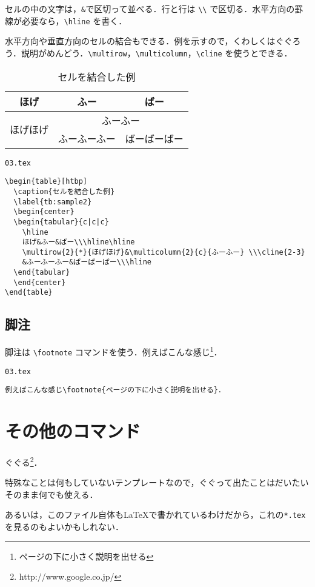 セルの中の文字は，\texttt{\&}で区切って並べる．行と行は \verb|\\| で区切る．水平方向の罫線が必要なら，\verb|\hline| を書く．

水平方向や垂直方向のセルの結合もできる．例を示すので，くわしくはぐぐろう．説明がめんどう．\verb|\multirow|，\verb|\multicolumn|，\verb|\cline| を使うとできる．

\begin{table}[htbp]
  \caption{セルを結合した例}
  \label{tb:sample2}
  \begin{center}
  \begin{tabular}{c|c|c}
    \hline
    ほげ&ふー&ばー\\\hline\hline
    \multirow{2}{*}{ほげほげ}&\multicolumn{2}{c}{ふーふー} \\\cline{2-3}
    &ふーふーふー&ばーばーばー\\\hline
  \end{tabular}
  \end{center}
\end{table}

\begin{itembox}[l]{\texttt{03.tex}}
\begin{verbatim}
\begin{table}[htbp]
  \caption{セルを結合した例}
  \label{tb:sample2}
  \begin{center}
  \begin{tabular}{c|c|c}
    \hline
    ほげ&ふー&ばー\\\hline\hline
    \multirow{2}{*}{ほげほげ}&\multicolumn{2}{c}{ふーふー} \\\cline{2-3}
    &ふーふーふー&ばーばーばー\\\hline
  \end{tabular}
  \end{center}
\end{table}
\end{verbatim}
\end{itembox}


\subsection{脚注}

脚注は \verb|\footnote| コマンドを使う．例えばこんな感じ\footnote{ページの下に小さく説明を出せる}．

\begin{itembox}[l]{\texttt{03.tex}}
\begin{verbatim}
例えばこんな感じ\footnote{ページの下に小さく説明を出せる}．
\end{verbatim}
\end{itembox}

\section{その他のコマンド}

ぐぐる\footnote{http://www.google.co.jp/}．

特殊なことは何もしていないテンプレートなので，ぐぐって出たことはだいたいそのまま何でも使える．

あるいは，このファイル自体も\LaTeX で書かれているわけだから，これの\texttt{*.tex}を見るのもよいかもしれない．
